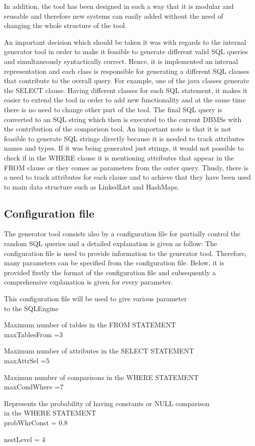 In addition, the tool has been designed in such a way that it is modular and reusable and therefore new systems can easily added without the need of changing the whole structure of the tool.

An important decision which should be taken it was with regards to the internal generator tool in order to make it feasible to generate different valid SQL queries and simultaneously syntactically correct. Hence, it is implemented an internal representation and each class is responsible for generating a different SQL clauses that contribute to the overall query. For example, one of the java classes generate the SELECT clause. Having different classes for each SQL statement, it makes it easier to extend the tool in order to add new functionality and at the same time there is no need to change other part of the tool. The final SQL query is converted to an SQL string which then is executed to the current DBMSs with the contribution of the comparison tool. An important note is that it is not feasible to generate SQL strings directly because it is needed to track attributes names and types. If it was being generated just strings, it would not possible to check if in the WHERE clause it is mentioning attributes that appear in the FROM clause or they comes as parameters from the outer query. Thusly, there is a need to track attributes for each clause and to achieve that they have been used to main data structure such as LinkedList and HashMaps.

\subsection{Configuration file}
The generator tool consists also by a configuration file for partially control the random SQL queries and a detailed explanation is given as follow: The configuration file is used to provide information to the generator tool. Therefore, many parameters can be specified from the configuration file. Below, it is provided firstly the format of the configuration file and subsequently a comprehensive explanation is given  for every parameter. 

\begin{mdframed}[backgroundcolor=gray!20] 
  This configuration file will be used to give various parameter
  \\ to the SQLEngine

  Maximum number of tables in the FROM STATEMENT
\\maxTablesFrom =3

  Maximum number of attributes in the SELECT STATEMENT
\\maxAttrSel =5

  Maximun number of comparisons in the WHERE STATEMENT
\\maxCondWhere =7

 Represents the probability of having constants or NULL comparison \\ in the WHERE STATEMENT
\\probWhrConst = 0.8

 nestLevel = 4
\end{mdframed}

